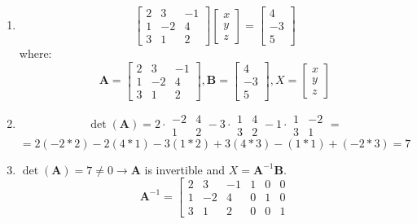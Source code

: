 \documentclass{article}
\begin{document}
\begin{enumerate}
    \item $$ \left[ \begin{array}{ccc} 2 & 3 & -1 \\ 1 & -2 & 4 \\ 3 & 1 & 2 \end{array} \right] \left[ \begin{array}{c} x \\ y \\ z \end{array} \right] = \left[ \begin{array}{c} 4 \\ -3 \\ 5 \end{array} \right]$$
    where:
    $$\mathbf{A} = \left[ \begin{array}{ccc} 2 & 3 & -1 \\ 1 & -2 & 4 \\ 3 & 1 & 2 \end{array} \right], 
    \mathbf{B}= \left[ \begin{array}{c} 4 \\ -3 \\ 5 \end{array} \right], 
    X=\left[ \begin{array}{c} x \\ y \\ z \end{array} \right] $$
    \item $$\det (\mathbf{A})= 2 \cdot \begin{array}{|cc|} -2 & 4 \\ 1 & 2 \end{array} - 3 \cdot \begin{array}{|cc|} 1 & 4 \\ 3 & 2 \end{array} -1 \cdot \begin{array}{|cc|} 1 & -2 \\ 3 & 1 \end{array} = $$
    $$= 2(-2*2) - 2(4*1) - 3(1*2) + 3(4*3) - (1*1) + (-2*3)=7$$ 
    \item  $\det (\mathbf{A})= 7 \neq 0 \rightarrow \mathbf{A}$ is invertible and $X = \mathbf{A}^{-1}\mathbf{B}$.
    $$\mathbf{A}^{-1}= \left[\begin{array}{ccc|ccc}
      2 & 3 & -1 & 1 & 0 & 0 \\ 1 & -2 & 4 & 0 & 1 & 0\\ 3 & 1 & 2 & 0 & 0 & 1 

\end{array}$$
\end{enumerate}
\end{document}
